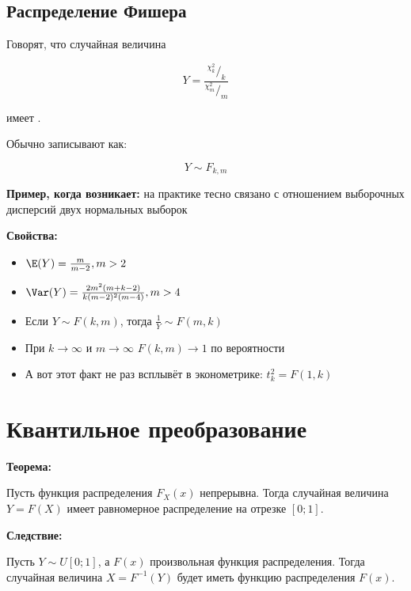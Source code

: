 \documentclass[12pt, a4paper, oneside]{article}
\begin{document}
\subsection*{Распределение Фишера}

Говорят, что случайная величина 

$$ Y = \frac{^{\chi^2_k}/_k}{^{\chi^2_m}/_m}$$

имеет .

Обычно записывают как:

$$
Y \sim F_{k,m}
$$   

\textbf{Пример, когда возникает:} на практике тесно связано с отношением выборочных дисперсий двух нормальных выборок

\textbf{Свойства:}

\begin{itemize} 
\item $\E(Y) = \frac{m}{m-2}, m > 2$
\item $\Var(Y) = \frac{2m^2(m + k - 2)}{k (m - 2)^2 (m - 4) }, m > 4$
\item Если $Y \sim F(k,m)$, тогда $\frac{1}{Y} \sim F(m,k)$
\item При $k \to \infty$ и $m \to \infty$ $F(k,m) \to 1$ по вероятности
\item А вот этот факт не раз всплывёт в эконометрике: $t_k^2 = F(1,k)$
\end{itemize} 

\section*{Квантильное преобразование}

\textbf{Теорема:}

Пусть функция распределения $F_X(x)$ непрерывна. Тогда случайная величина $Y = F(X)$ имеет равномерное распределение на отрезке $[0; 1]$.

\textbf{Следствие:}

Пусть $Y \sim U[0;1]$, а $F(x)$ произвольная функция распределения. Тогда случайная величина $X = F^{-1}(Y)$ будет иметь функцию распределения $F(x)$.
\end{document}
